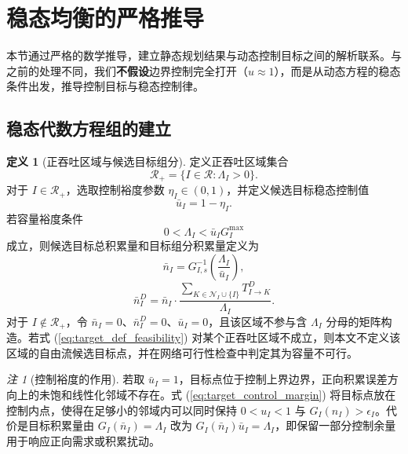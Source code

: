 \documentclass[a4paper,12pt]{article}
\theoremstyle{plain}
\theoremstyle{definition}
\newtheorem{definition}[theorem]{定义}
\theoremstyle{remark}
\newtheorem{remark}[theorem]{注}
\begin{document}
\section{稳态均衡的严格推导}

本节通过严格的数学推导，建立静态规划结果与动态控制目标之间的解析联系。与之前的处理不同，我们\textbf{不假设}边界控制完全打开（$u\approx 1$），而是从动态方程的稳态条件出发，推导控制目标与稳态控制律。

\subsection{稳态代数方程组的建立}

\begin{definition}[正吞吐区域与候选目标组分]\label{def:target_component}
定义正吞吐区域集合
\begin{equation}\label{eq:positive_regions}
    \mathcal R_+ = \{I\in\mathcal R:\Lambda_I>0\}.
\end{equation}
对于 $I\in\mathcal R_+$，选取控制裕度参数 $\eta_I\in(0,1)$，并定义候选目标稳态控制值
\begin{equation}\label{eq:target_control_margin}
    \bar u_I=1-\eta_I .
\end{equation}
若容量裕度条件
\begin{equation}\label{eq:target_def_feasibility}
    0<\Lambda_I<\bar u_I G_I^{\max}
\end{equation}
成立，则候选目标总积累量和目标组分积累量定义为
\begin{equation}\label{eq:target_total}
    \bar{n}_I = G_{I,s}^{-1}\left(\frac{\Lambda_I}{\bar u_I}\right),
\end{equation}
\begin{equation} \label{eq:target_component}
    \bar{n}_I^D = \bar{n}_I \cdot \frac{\sum_{K \in \mathcal{N}_I \cup \{I\}} T_{I \to K}^D}{\Lambda_I}.
\end{equation}
对于 $I\notin\mathcal R_+$，令 $\bar n_I=0$、$\bar n_I^D=0$、$\bar u_I=0$，且该区域不参与含 $\Lambda_I$ 分母的矩阵构造。若式 (\ref{eq:target_def_feasibility}) 对某个正吞吐区域不成立，则本文不定义该区域的自由流候选目标点，并在网络可行性检查中判定其为容量不可行。
\end{definition}

\begin{remark}[控制裕度的作用]\label{rem:control_margin}
若取 $\bar u_I=1$，目标点位于控制上界边界，正向积累误差方向上的未饱和线性化邻域不存在。式 (\ref{eq:target_control_margin}) 将目标点放在控制内点，使得在足够小的邻域内可以同时保持 $0<u_I<1$ 与 $G_I(n_I)>\epsilon_I$。代价是目标积累量由 $G_I(\bar n_I)=\Lambda_I$ 改为 $G_I(\bar n_I)\bar u_I=\Lambda_I$，即保留一部分控制余量用于响应正向需求或积累扰动。
\end{remark}
\end{document}
